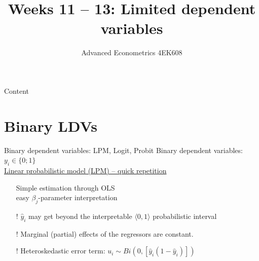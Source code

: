 \documentclass[usenames,dvipsnames]{beamer}
\title[Week11]{Weeks 11 -- 13: Limited dependent variables}
\author{Advanced Econometrics 4EK608}
\institute{Vysoká škola ekonomická v Praze}
\date{}
\begin{document}
 
\begin{frame}
  \titlepage
\end{frame}

\begin{frame}{Content}
  \tableofcontents
\end{frame}

\section{Binary LDVs}
\begin{frame}{Binary dependent variables: LPM, Logit, Probit}
Binary dependent variables: $y_i \in \{0;1\}$\\
\vspace{1cm}
\underline{Linear probabilistic model (LPM) – quick repetition}\\
\bigskip
\begin{itemize}
\item[\checkmark] Simple estimation through OLS \\ easy $\beta_j$-parameter interpretation\\
\medskip
\item[!] $\hat{y}_i$ may get beyond the interpretable $\langle 0, 1 \rangle$ probabilistic interval\\
\smallskip
\item[!] Marginal (partial) effects of the regressors are constant. \\
\smallskip
\item[!] Heteroskedastic error term: $u_i \sim Bi (0, [\hat{y}_i (1 - \hat{y}_i)])$
\end{itemize}
\end{frame}
\end{document}
